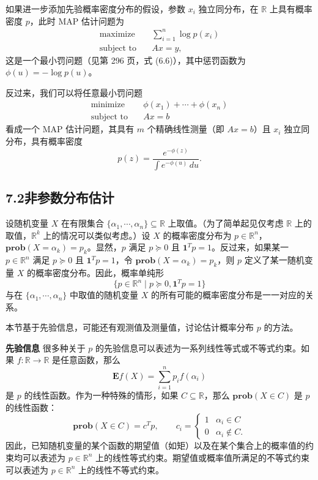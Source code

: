 \documentclass[UTF8,12pt,a4paper,fontset=fandol]{ctexart}
\begin{document}
如果进一步添加先验概率密度分布的假设，参数 $x_i$ 独立同分布，在 $\mathbb{R}$ 上具有概率密度 $p$，此时 MAP 估计问题为
\[
\begin{aligned}
\text{maximize}\quad & \sum_{i=1}^n \log p(x_i)\\
\text{subject to}\quad & Ax=y,
\end{aligned}
\]
这是一个最小罚问题（见第 296 页，式 (6.6)），其中惩罚函数为 $\phi(u)=-\log p(u)$。

反过来，我们可以将任意最小罚问题
\[
\begin{aligned}
\text{minimize}\quad & \phi(x_1)+\cdots+\phi(x_n)\\
\text{subject to}\quad & Ax=b
\end{aligned}
\]
看成一个 MAP 估计问题，其具有 $m$ 个精确线性测量（即 $Ax=b$）且 $x_i$ 独立同分布，具有概率密度
\[
p(z)=\frac{e^{-\phi(z)}}{\int e^{-\phi(u)}\,du}.
\]

\subsection*{7.2\quad 非参数分布估计}

设随机变量 $X$ 在有限集合 $\{\alpha_1,\cdots,\alpha_n\}\subseteq\mathbb{R}$ 上取值。（为了简单起见仅考虑 $\mathbb{R}$ 上的取值，$\mathbb{R}^k$ 上的情况可以类似考虑。）设 $X$ 的概率密度分布为 $p\in\mathbb{R}^n$，$\mathbf{prob}(X=\alpha_k)=p_k$。显然，$p$ 满足 $p\succeq 0$ 且 $\mathbf{1}^T p=1$。反过来，如果某一 $p\in\mathbb{R}^n$ 满足 $p\succeq 0$ 且 $\mathbf{1}^Tp=1$，令 $\mathbf{prob}(X=\alpha_k)=p_k$，则 $p$ 定义了某一随机变量 $X$ 的概率密度分布。因此，概率单纯形
\[
\{p\in\mathbb{R}^n\mid p\succeq 0,\mathbf{1}^Tp=1\}
\]
与在 $\{\alpha_1,\cdots,\alpha_n\}$ 中取值的随机变量 $X$ 的所有可能的概率密度分布是一一对应的关系。

本节基于先验信息，可能还有观测值及测量值，讨论估计概率分布 $p$ 的方法。

\noindent\textbf{先验信息}\quad
很多种关于 $p$ 的先验信息可以表述为一系列线性等式或不等式约束。如果 $f:\mathbb{R}\to\mathbb{R}$ 是任意函数，那么
\[
\mathbf{E}f(X)=\sum_{i=1}^n p_i f(\alpha_i)
\]
是 $p$ 的线性函数。作为一种特殊的情形，如果 $C\subseteq\mathbb{R}$，那么 $\mathbf{prob}(X\in C)$ 是 $p$ 的线性函数：
\[
\mathbf{prob}(X\in C)=c^T p,\qquad
c_i=
\begin{cases}
1 & \alpha_i\in C\\
0 & \alpha_i\notin C.
\end{cases}
\]
因此，已知随机变量的某个函数的期望值（如矩）以及在某个集合上的概率值的约束均可以表述为 $p\in\mathbb{R}^n$ 上的线性等式约束。期望值或概率值所满足的不等式约束可以表述为 $p\in\mathbb{R}^n$ 上的线性不等式约束。
\end{document}
